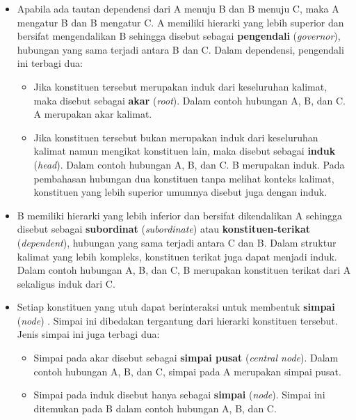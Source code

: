 \begin{itemize}
\item Apabila ada tautan dependensi dari A menuju B dan B menuju C, maka A mengatur B dan B mengatur C. A memiliki hierarki yang lebih superior dan bersifat mengendalikan B sehingga disebut sebagai \textbf{pengendali} (\textit{governor}), hubungan yang sama terjadi antara B dan C. Dalam dependensi, pengendali ini terbagi dua:
\begin{itemize} 
\item Jika konstituen tersebut merupakan induk dari keseluruhan kalimat, maka disebut sebagai \textbf{\gls{akar}} (\textit{root}). Dalam contoh hubungan A, B, dan C. A merupakan akar kalimat.
\item Jika konstituen tersebut bukan merupakan induk dari keseluruhan kalimat namun mengikat konstituen lain, maka disebut sebagai \textbf{\gls{induk}} (\textit{head}). Dalam contoh hubungan A, B, dan C. B merupakan induk. Pada pembahasan hubungan dua konstituen tanpa melihat konteks kalimat, konstituen yang lebih superior umumnya disebut juga dengan induk.
\end{itemize}
\item B memiliki hierarki yang lebih inferior dan bersifat dikendalikan A sehingga disebut sebagai \textbf{subordinat} (\textit{subordinate}) atau \textbf{\gls{konstituen-terikat}} (\textit{dependent}), hubungan yang sama terjadi antara C dan B. Dalam struktur kalimat yang lebih kompleks, konstituen terikat juga dapat menjadi induk. Dalam contoh hubungan A, B, dan C, B merupakan konstituen terikat dari A sekaligus induk dari C.
\item Setiap konstituen yang utuh dapat berinteraksi untuk membentuk \textbf{simpai} (\textit{node}) \citep{tesniere1959elements}. Simpai ini dibedakan tergantung dari hierarki konstituen tersebut. Jenis simpai ini juga terbagi dua:
\begin{itemize}
\item Simpai pada akar disebut sebagai \textbf{simpai pusat} (\textit{central node}). Dalam contoh hubungan A, B, dan C, simpai pada A merupakan simpai pusat.
\item Simpai pada induk disebut hanya sebagai \textbf{simpai} (\textit{node}). Simpai ini ditemukan pada B dalam contoh hubungan A, B, dan C.
\end{itemize}
\end{itemize}

